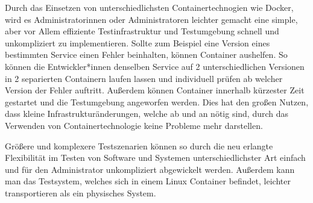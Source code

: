 
Durch das Einsetzen von unterschiedlichsten Containertechnogien wie Docker, wird es Administratorinnen oder Administratoren leichter gemacht eine simple, aber vor Allem effiziente Testinfrastruktur und Testumgebung schnell und unkompliziert zu implementieren. Sollte zum Beispiel eine Version eines bestimmten Service einen Fehler beinhalten, können Container aushelfen. So können die Entwickler*innen denselben Service auf 2 unterschiedlichen Versionen in 2 separierten Containern laufen lassen und individuell prüfen ab welcher Version der Fehler auftritt. Außerdem können Container innerhalb kürzester Zeit gestartet und die Testumgebung angeworfen werden. Dies hat den großen Nutzen, dass kleine Infrastrukturänderungen, welche ab und an nötig sind, durch das Verwenden von Containertechnologie keine Probleme mehr darstellen. \cite{TestenContainer}

Größere und komplexere Testszenarien können so durch die neu erlangte Flexibilität im Testen von Software und Systemen unterschiedlichster Art einfach und für den Administrator unkompliziert abgewickelt werden. Außerdem kann man das Testsystem, welches sich in einem Linux Container befindet, leichter transportieren als ein physisches System. \cite{TestenContainer}
